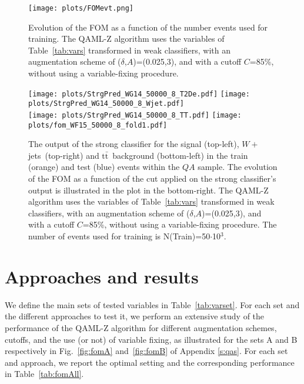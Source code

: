 \documentclass{article}
\newcommand{\wjets}{\ensuremath{W+}jets~}
\newcommand{\ttbar}{\ensuremath{\mathrm{t}\bar{\mathrm{t}}}~}
\begin{document}
\begin{figure}[!htbp]
\begin{center}
\texttt{[image: plots/FOMevt.png]}
\end{center} 
\caption{Evolution of the FOM as a function of the number events used for
  training. The QAML-Z algorithm uses the variables of Table~\ref{tab:vars} transformed
  in weak classifiers, with an augmentation scheme of ($\delta$,$A$)=(0.025,3),
  and with a cutoff $C$=85\%, without using a variable-fixing procedure.}
\label{fig:fom15}
\end{figure}

\begin{figure}[!htbp]
\begin{center}
\texttt{[image: plots/StrgPred\_WG14\_50000\_8\_T2De.pdf]}
\texttt{[image: plots/StrgPred\_WG14\_50000\_8\_Wjet.pdf]} \\
\texttt{[image: plots/StrgPred\_WG14\_50000\_8\_TT.pdf]}
\texttt{[image: plots/fom\_WF15\_50000\_8\_fold1.pdf]}
\end{center} 
\caption{The output of the strong classifier for the signal (top-left),
  \wjets (top-right) and \ttbar background (bottom-left) in the train
  (orange) and test (blue) events within the $QA$ sample. The evolution
  of the FOM as a function of the cut applied on the strong classifier's
  output is illustrated in the plot in the bottom-right. The QAML-Z algorithm uses
  the variables of Table~\ref{tab:vars} transformed in weak classifiers,
  with an augmentation scheme of ($\delta$,$A$)=(0.025,3), and with a
  cutoff $C$=85\%, without using a variable-fixing procedure. The number
  of events used for training is N(Train)=50$\cdot$10$^3$.}
\label{fig:plots15}
\end{figure}

\section{Approaches and results}
\label{s:res}

We define the main sets of tested variables in Table~\ref{tab:varset}. For each
set and the different approaches to test it, we perform an extensive study of
the performance of the QAML-Z algorithm for different augmentation schemes,
cutoffs, and the use (or not) of variable fixing, as illustrated for the sets
A and B respectively in Fig.~\ref{fig:fomA} and~\ref{fig:fomB} of Appendix
\ref{s:qas}. For each set and approach, we report the optimal setting and the
corresponding performance in Table~\ref{tab:fomAll}.
\end{document}
